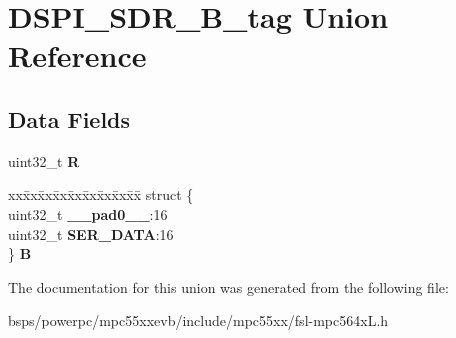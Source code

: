 \hypertarget{unionDSPI__SDR__32B__tag}{}\section{D\+S\+P\+I\+\_\+\+S\+D\+R\+\_\+B\+\_\+tag Union Reference}
\label{unionDSPI__SDR__32B__tag}
\subsection*{Data Fields}
\begin{DoxyCompactItemize}
\item 
\mbox{\label{unionDSPI__SDR__32B__tag_af453692c45161dbfebb9007f132bbf76}} 
uint32\+\_\+t {\bfseries R}
\item 
\mbox{\label{unionDSPI__SDR__32B__tag_af4efb684b1f8b32823120bfc7672ebef}} 
\begin{tabbing}
xx\=xx\=xx\=xx\=xx\=xx\=xx\=xx\=xx\=\kill
struct \{\\
\>uint32\_t {\bfseries \_\_pad0\_\_}:16\\
\>uint32\_t {\bfseries SER\_DATA}:16\\
\} {\bfseries B}\\

\end{tabbing}\end{DoxyCompactItemize}


The documentation for this union was generated from the following file\+:\begin{DoxyCompactItemize}
\item 
bsps/powerpc/mpc55xxevb/include/mpc55xx/fsl-\/mpc564x\+L.\+h\end{DoxyCompactItemize}

